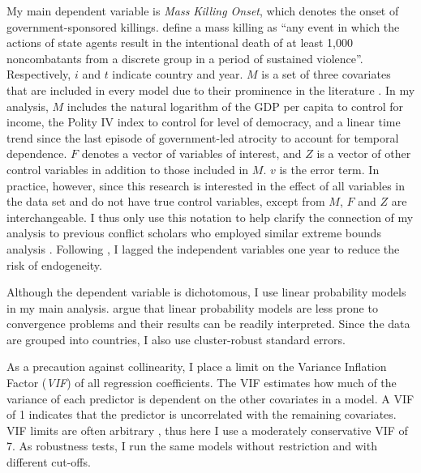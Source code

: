 My main dependent variable is \textit{Mass Killing Onset}, which denotes the onset of government-sponsored killings. \citet[2]{ulfelder2008assessing} define a mass killing as ``any event in which the actions of state agents result in the intentional death of at least 1,000 noncombatants from a discrete group in a period of sustained violence''. Respectively, $i$ and $t$ indicate country and year. $M$ is a set of three covariates that are included in every model due to their prominence in the literature \citep{levine1992vale}. In my analysis, $M$ includes the natural logarithm of the GDP per capita to control for income, the Polity IV index to control for level of democracy, and a linear time trend since the last episode of government-led atrocity to account for temporal dependence. $F$ denotes a vector of variables of interest, and $Z$ is a vector of other control variables in addition to those included in $M$. $v$ is the error term. In practice, however, since this research is interested in the effect of all variables in the data set and do not have true control variables, except from $M$, $F$ and $Z$ are interchangeable. I thus only use this notation to help clarify the connection of my analysis to previous conflict scholars who employed similar extreme bounds analysis \citep[e.g.,][]{hegre2006sensitivity,gassebner2016expect}. Following \citet[514]{hegre2006sensitivity}, I lagged the independent variables one year to reduce the risk of endogeneity. 

Although the dependent variable is dichotomous, I use linear probability models in my main analysis. \citet[298]{gassebner2016expect} argue that linear probability models are less prone to convergence problems and their results can be readily interpreted. Since the data are grouped into countries, I also use cluster-robust standard errors.
	 
As a precaution against collinearity, I place a limit on the Variance Inflation Factor (\textit{VIF}) of all regression coefficients. The VIF estimates how much of the variance of each predictor is dependent on the other covariates in a model. A VIF of 1 indicates that the predictor is uncorrelated with the remaining covariates. VIF limits are often arbitrary \citep{bell2015examining,o2007caution}, thus here I use a moderately conservative VIF of 7. As robustness tests, I run the same models without restriction and with different cut-offs.
	
